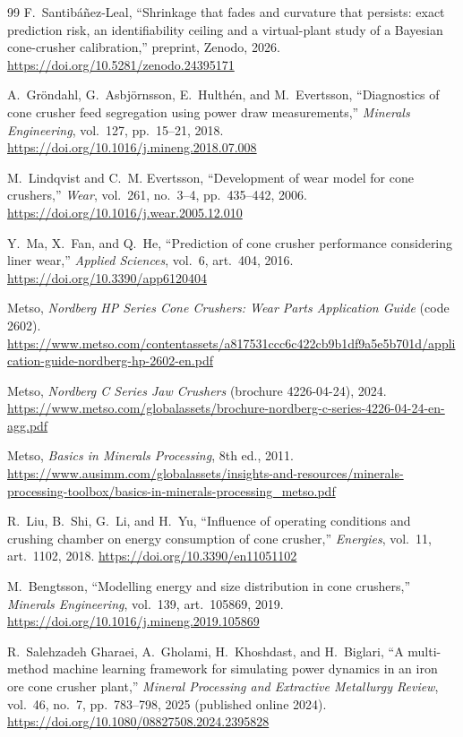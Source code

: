 \begin{thebibliography}{99}
 F.~Santib\'a\~nez-Leal, ``Shrinkage that fades and curvature that persists: exact prediction risk, an
identifiability ceiling and a virtual-plant study of a Bayesian cone-crusher calibration,'' preprint, Zenodo, 2026.
\url{https://doi.org/10.5281/zenodo.24395171}

 A.~Gr\"ondahl, G.~Asbj\"ornsson, E.~Hulth\'en, and M.~Evertsson, ``Diagnostics of cone crusher feed segregation using power draw
measurements,'' \emph{Minerals Engineering}, vol.~127, pp.~15--21, 2018. \url{https://doi.org/10.1016/j.mineng.2018.07.008}

 M.~Lindqvist and C.~M. Evertsson, ``Development of wear model for cone crushers,'' \emph{Wear}, vol.~261, no.~3--4, pp.~435--442, 2006.
\url{https://doi.org/10.1016/j.wear.2005.12.010}

 Y.~Ma, X.~Fan, and Q.~He, ``Prediction of cone crusher performance considering liner wear,'' \emph{Applied Sciences}, vol.~6, art.~404,
2016. \url{https://doi.org/10.3390/app6120404}

 Metso, \emph{Nordberg HP Series Cone Crushers: Wear Parts Application Guide} (code 2602).
\url{https://www.metso.com/contentassets/a817531ccc6c422cb9b1df9a5e5b701d/application-guide-nordberg-hp-2602-en.pdf}

 Metso, \emph{Nordberg C Series Jaw Crushers} (brochure 4226-04-24), 2024.
\url{https://www.metso.com/globalassets/brochure-nordberg-c-series-4226-04-24-en-agg.pdf}

 Metso, \emph{Basics in Minerals Processing}, 8th ed., 2011.
\url{https://www.ausimm.com/globalassets/insights-and-resources/minerals-processing-toolbox/basics-in-minerals-processing_metso.pdf}

 R.~Liu, B.~Shi, G.~Li, and H.~Yu, ``Influence of operating conditions and crushing chamber on energy consumption of cone crusher,''
\emph{Energies}, vol.~11, art.~1102, 2018. \url{https://doi.org/10.3390/en11051102}

 M.~Bengtsson, ``Modelling energy and size distribution in cone crushers,'' \emph{Minerals Engineering}, vol.~139, art.~105869,
2019. \url{https://doi.org/10.1016/j.mineng.2019.105869}

 R.~Salehzadeh Gharaei, A.~Gholami, H.~Khoshdast, and H.~Biglari, ``A multi-method machine learning framework for simulating power
dynamics in an iron ore cone crusher plant,'' \emph{Mineral Processing and Extractive Metallurgy Review}, vol.~46, no.~7, pp.~783--798, 2025 (published online 2024).
\url{https://doi.org/10.1080/08827508.2024.2395828}


\end{thebibliography}
